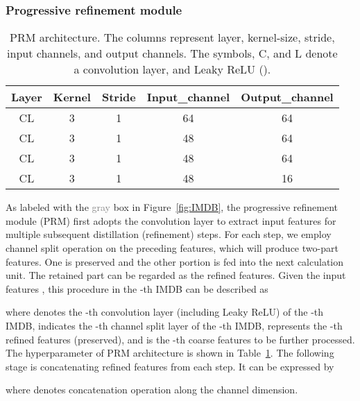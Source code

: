 \documentclass[sigconf]{acmart}
\begin{document}
\subsubsection{Progressive refinement module}
\begin{table}[htpb]
	\centering
	\small
	\caption{PRM architecture. The columns represent layer, kernel-size, stride, input channels, and output channels. The symbols, C, and L denote a convolution layer, and Leaky ReLU ().}
	\begin{tabular}{ccccc}
		\hline
		Layer & Kernel & Stride & Input\_channel & Output\_channel \\
		\hline
		CL & 3 & 1 & 64 & 64 \\
		CL & 3 & 1 & 48 & 64 \\
		CL & 3 & 1 & 48 & 64 \\
		CL & 3 & 1 & 48 & 16 \\
		\hline
	\end{tabular}
	\label{tab:prm}
\end{table}

As labeled with the \textcolor{gray}{gray} box in Figure~\ref{fig:IMDB}, the progressive refinement module (PRM) first adopts the  convolution layer to extract input features for multiple subsequent distillation (refinement) steps. For each step, we employ channel split operation on the preceding features, which will produce two-part features. One is preserved and the other portion is fed into the next calculation unit. The retained part can be regarded as the refined features. Given the input features , this procedure in the -th IMDB can be described as

where  denotes the -th convolution layer (including Leaky ReLU) of the -th IMDB,  indicates the -th channel split layer of the -th IMDB,  represents the -th refined features (preserved), and  is the -th coarse features to be further processed. The hyperparameter of PRM architecture is shown in Table~\ref{tab:prm}. The following stage is concatenating refined features from each step. It can be expressed by

where  denotes concatenation operation along the channel dimension.
\end{document}
